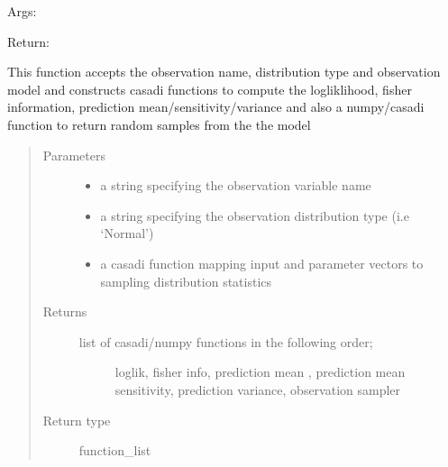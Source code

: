 \documentclass[letterpaper,10pt,english,openany,oneside]{sphinxmanual}
\begin{document}
\begin{fulllineitems}
\begin{fulllineitems}
Args:

Return:

\end{fulllineitems}


\begin{fulllineitems}
\label{\detokenize{nloed:nloed.model.Model._get_distribution_functions}}
This function accepts the observation name, distribution type
and observation model and constructs casadi functions to compute
the logliklihood, fisher information, prediction mean/sensitivity/variance
and also a numpy/casadi function to return random samples from the the model
\begin{quote}\begin{description}
\item[{Parameters}] \leavevmode\begin{itemize}
\item {} 
 \textendash{} a string specifying the observation variable name

\item {} 
 \textendash{} a string specifying the observation distribution type (i.e ‘Normal’)

\item {} 
 \textendash{} a casadi function mapping input and parameter vectors to sampling distribution statistics

\end{itemize}

\item[{Returns}] \leavevmode
\begin{description}
\item[{list of casadi/numpy functions in the following order;}] \leavevmode
loglik, fisher info, prediction mean , prediction mean sensitivity,
prediction variance, observation sampler

\end{description}


\item[{Return type}] \leavevmode
function\_list


\end{description}
\end{quote}
\end{fulllineitems}
\end{fulllineitems}
\end{document}
